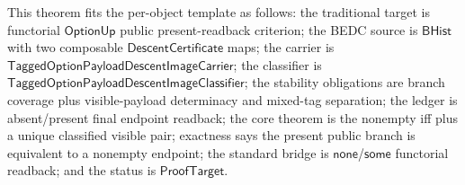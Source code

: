 \begin{theorem}
\label{thm:tagged-option-composite-image-classifier-nonempty-public-readback-equivalence}
This theorem fits the per-object template as follows: the traditional target is
functorial $\mathsf{OptionUp}$ public present-readback criterion; the BEDC
source is $\mathsf{BHist}$ with two composable $\mathsf{DescentCertificate}$
maps; the carrier is $\mathsf{TaggedOptionPayloadDescentImageCarrier}$; the
classifier is $\mathsf{TaggedOptionPayloadDescentImageClassifier}$; the
stability obligations are branch coverage plus visible-payload determinacy and
mixed-tag separation; the ledger is absent/present final endpoint readback; the
core theorem is the nonempty iff plus a unique classified visible pair;
exactness says the present public branch is equivalent to a nonempty endpoint;
the standard bridge is $\mathsf{none}$/$\mathsf{some}$ functorial readback; and
the status is $\mathsf{ProofTarget}$.


\end{theorem}
